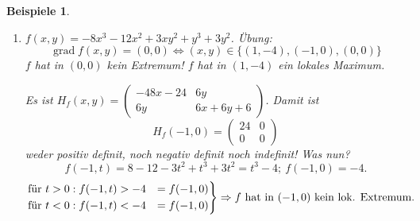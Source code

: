\documentclass[12pt]{extreport} %
\theoremstyle{named}
\theoremstyle{nnamed}
\theoremstyle{itshape}
\theoremstyle{normal}
\newtheorem*{beispiele}{Beispiele}
\begin{document}
\begin{beispiele}
\begin{enumerate}
\begin{itemize}
				\item $H_{f}(0, 0) = \begin{pmatrix} 0 & -12 \\ -12 & 0 \end{pmatrix}$; $\det H_{f}(0, 0) < 0$. 
					$$f  \text{ hat also in } (0, 0) \text{ kein Extremum.} $$ 
				\item $H_{f}(2, 1) = \begin{pmatrix} 12 & -12 \\ -12 & 48 \end{pmatrix}$; $12 > 0$, $\det H_{f}(2, 1) = 12 \cdot 48 - 12 \cdot 12 > 0$. 
					$$ f \text{ hat also in } (2, 1) \text{ ein lokales Minimum}. $$ 
			  \end{itemize}
			$(2, 1)$ ist keine globale Minimalstelle, denn z.B. $f(t, 0) = t^{3} \longrightarrow - \infty$ $(t \rightarrow -\infty)$.
		\item $f(x, y) = - 8x^{3} - 12 x^{2} + 3xy^{2} + y^{3} + 3 y^{2}$. Übung:
			$$ \operatorname{grad} f(x, y) = (0, 0) \iff (x, y) \in \{ (1, -4), (-1, 0), (0, 0) \} $$
			$f$ hat in $(0, 0)$ kein Extremum! $f$ hat in $(1, -4)$ ein lokales Maximum.
			
			\bigskip
			
			Es ist $ H_{f}(x, y) = \begin{pmatrix} -48x - 24 & 6y \\ 6y & 6x + 6y + 6 \end{pmatrix}$. Damit ist
			$$ H_{f}(-1, 0) = \begin{pmatrix} 24 & 0 \\ 0 & 0 \end{pmatrix} $$
			weder positiv definit, noch negativ definit noch indefinit! Was nun? %
			$$ f(-1, t) = 8 - 12 - 3 t^{2} + t^{3} + 3 t^{2} = t^{3} - 4; ~ f(-1, 0) = -4. $$
			$$ \begin{rcases} \text{für } t > 0: f(-1, t) > -4  & = f(-1, 0) \\ \text{für } t < 0: f(-1, t) < -4  & = f(-1, 0) \end{rcases} \Rightarrow f \text{ hat in } (-1, 0) \text{ kein lok. Extremum.} $$
 	\end{enumerate}	
\end{beispiele}
\end{document}

